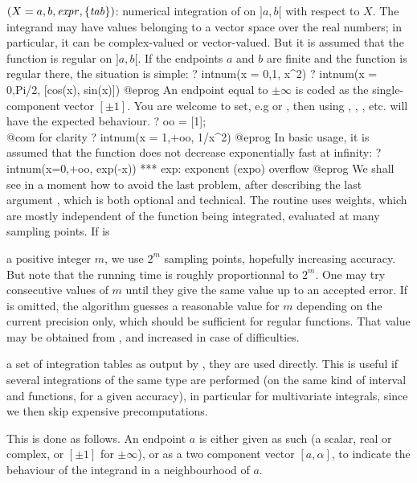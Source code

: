 $(X=a,b,\hbox{\it expr\/},\{\hbox{\it tab\/}\})$: numerical integration
of  on $]a,b[$ with respect to $X$. The integrand may have values
belonging to a vector space over the real numbers; in particular, it can be
complex-valued or vector-valued. But it is assumed that the function is regular
on $]a,b[$. If the endpoints $a$ and $b$ are finite and the function is regular
there, the situation is simple:
\bprog
  ? intnum(x = 0,1, x^2)
  ? intnum(x = 0,Pi/2, [cos(x), sin(x)])
@eprog\noindent
An endpoint equal to $\pm\infty$ is coded as the single-component vector
$[\pm1]$. You are welcome to set, e.g  or ,
then using , , , etc. will have the expected
behaviour.
\bprog
  ? oo = [1];  \\@com for clarity
  ? intnum(x = 1,+oo, 1/x^2)
@eprog\noindent
In basic usage, it is assumed that the function does not decrease
exponentially fast at infinity:
\bprog
  ? intnum(x=0,+oo, exp(-x))
    *** exp: exponent (expo) overflow
@eprog\noindent
We shall see in a moment how to avoid the last problem, after describing
the last argument , which is both optional and technical. The
routine uses weights, which are mostly independent of the function being
integrated, evaluated at many sampling points. If  is

\item a positive integer $m$, we use $2^m$ sampling points, hopefully
increasing accuracy. But note that the running time is roughly proportionnal
to $2^m$. One may try consecutive values of $m$ until they give the same
value up to an accepted error. If  is omitted, the algorithm guesses
a reasonable value for $m$ depending on the current precision only, which
should be sufficient for regular functions. That value may be obtained from
, and increased in case of difficulties.

\item a set of integration tables as output by ,
they are used directly. This is useful if several integrations of the same
type are performed (on the same kind of interval and functions, for a given
accuracy), in particular for multivariate integrals, since we then skip
expensive precomputations.

This is done as follows. An endpoint $a$ is either given as such (a scalar,
real or complex, or $[\pm1]$ for $\pm\infty$), or as a two component vector
$[a,\alpha]$, to indicate the behaviour of the integrand in a neighbourhood
of $a$.

